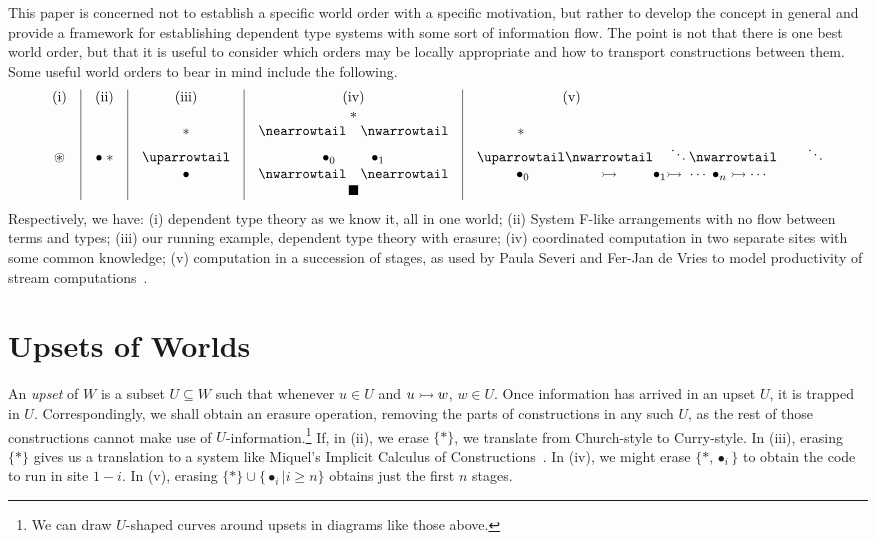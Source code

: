 \documentclass{sigplanconf}
\begin{document}
This paper is concerned not to establish a specific world order with a
specific motivation, but rather to develop the concept in general and
provide a framework for establishing dependent type systems with some
sort of information flow. The point is not that there is one best
world order, but that it is useful to consider which orders may be
locally appropriate and how to transport constructions between them.
Some useful world orders to bear in mind include the following.
\[\begin{array}{c@{\quad}|@{\quad}c@{\quad}|@{\quad}c@{\quad}|@{\quad}c@{\quad}|@{\quad}c@{}c@{}c@{}l}
\mbox{(i)} & \mbox{(ii)} & \mbox{(iii)} & \mbox{(iv)} &
\multicolumn{3}{c}{\mbox{(v)}} \\
            &               &               &     \ast 
\\
            &               &   \ast        & \nearrowtail\quad\nwarrowtail
  & \ast \\
\circledast & \bullet\;\ast & \uparrowtail  & \bullet_0\qquad\;\;\bullet_1 
  & \uparrowtail &\nwarrowtail & & \;\ddots \nwarrowtail \qquad\ddots\\
            &               &   \bullet     & \nwarrowtail\quad\nearrowtail 
  & \;\bullet_0&\rightarrowtail&\bullet_1&\rightarrowtail\;\cdots\;\bullet_n\rightarrowtail\cdots \\
            &               &               &     \blacksquare
\end{array}\]
Respectively, we have: (i) dependent type theory as we know it, all in
one world; (ii) System F-like arrangements with no flow
between terms and types; (iii) our running example, dependent type
theory with erasure; (iv) coordinated computation in two separate
sites with some common knowledge; (v) computation in a succession of
stages, as used by Paula Severi and Fer-Jan de Vries to model
productivity of stream computations~\cite{DBLP:conf/icfp/SeveriV12}.


\section{Upsets of Worlds}

An \emph{upset} of $W$ is a subset $U \subseteq W$ such that whenever
$u\in U$ and $u\rightarrowtail w$, $w\in U$. Once information has arrived in an
upset $U$, it is trapped in $U$. Correspondingly, we shall obtain an
erasure operation, removing the parts of constructions in any such
$U$, as the rest of those constructions cannot make use of
$U$-information.\footnote{We can draw $U$-shaped curves
around upsets in diagrams like those above.} If, in (ii), we erase
$\{\ast\}$, we translate from Church-style to
Curry-style. In (iii), erasing $\{\ast\}$ gives us a translation to a
system like Miquel's Implicit Calculus of
Constructions~\cite{DBLP:conf/tlca/Miquel01}. In (iv), we might erase
$\{\ast,\bullet_i\}$ to obtain the code to run in site $1-i$.
In (v), erasing $\{\ast\}\cup\{\bullet_i|i\ge n\}$ obtains
just the first $n$ stages.
\end{document}
